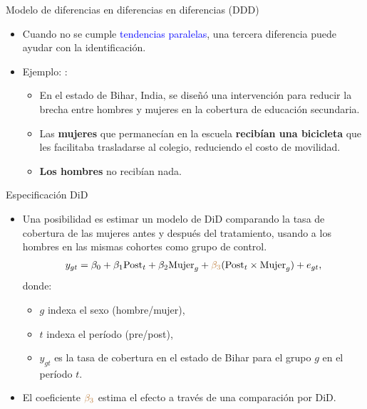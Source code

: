 \documentclass[10pt, xcolor=dvipsnames]{beamer}
\begin{document}
\begin{frame}{Modelo de diferencias en diferencias en diferencias (DDD)}
\begin{itemize}\setlength{\itemsep}{1.0em}
	\item Cuando no se cumple \textcolor{blue}{tendencias paralelas}, una tercera diferencia puede ayudar con la identificación.
	\item Ejemplo: \citet{muralidharan2017cycling}: 
	\smallspace
	\begin{itemize}\setlength{\itemsep}{0.3em}
		\item En el estado de Bihar, India, se diseñó una intervención para reducir la brecha entre hombres y mujeres en la cobertura de educación secundaria.
		\item Las \textbf{mujeres} que permanecían en la escuela \textbf{recibían una bicicleta} que les facilitaba trasladarse al colegio, reduciendo el costo de movilidad.
		\item \textbf{Los hombres} no recibían nada.
	\end{itemize}
\end{itemize}	
\end{frame}


\begin{frame}{Especificación DiD}
\begin{itemize}\setlength{\itemsep}{1.0em}
    \item Una posibilidad es estimar un modelo de DiD comparando la tasa de cobertura de las mujeres antes y después del tratamiento, usando a los hombres en las mismas cohortes como grupo de control.
    \smallspace
    \begin{align*}
        y_{gt} = \beta_0 + \beta_1 \text{Post}_t + \beta_2 \text{Mujer}_g + \textcolor{brown}{\beta_3} (\text{Post}_t \times \text{Mujer}_g) + e_{gt},
    \end{align*}
    donde:
    \begin{itemize}
        \item $g$ indexa el sexo (hombre/mujer),
        \item $t$ indexa el período (pre/post),
        \item $y_{gt}$ es la tasa de cobertura en el estado de Bihar para el grupo $g$ en el período $t$.
    \end{itemize}
    \item El coeficiente \(\textcolor{brown}{\beta_3}\) estima el efecto a través de una comparación por DiD.
\end{itemize}
\end{frame}
\end{document}
